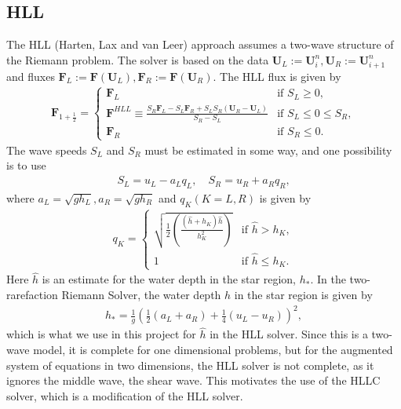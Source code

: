 \subsection*{HLL}
The HLL (Harten, Lax and van Leer) approach assumes a two-wave structure of the Riemann problem.
The solver is based on the data $\mathbf{U}_L := \mathbf{U}_i^n, \mathbf{U}_R := \mathbf{U}_{i+1}^n$ and fluxes $\mathbf{F}_L := \mathbf{F}(\mathbf{U}_L), \mathbf{F}_R := \mathbf{F}(\mathbf{U}_R)$.
The HLL flux is given by
\begin{align}\label{eq:HLL_flux}
    \mathbf{F}_{1 + \frac{1}{2}} = \begin{cases}
        \mathbf{F}_L & \text{if } S_L \geq 0, \\
        \mathbf{F}^{HLL} \equiv \frac{S_R \mathbf{F}_L - S_L \mathbf{F}_R + S_L S_R (\mathbf{U}_R - \mathbf{U}_L)}{S_R - S_L} & \text{if } S_L \leq 0 \leq S_R, \\
        \mathbf{F}_R & \text{if } S_R \leq 0.
    \end{cases}
\end{align}
The wave speeds $S_L$ and $S_R$ must be estimated in some way, and one possibility is to use 
\begin{align*}
    S_L = u_L - a_L q_L, \quad S_R = u_R + a_R q_R,
\end{align*}
where $a_L = \sqrt{g h_L}, a_R = \sqrt{g h_R}$ and  $q_K (K=L, R)$ is given by 
\begin{align*}
    q_K = 
    \begin{cases}
        \sqrt{\frac{1}{2}\left( \frac{(\hat{h} + h_K) \hat{h}}{h_K^2} \right) } & \text{if } \hat{h} > h_K, \\
        1 & \text{if } \hat{h} \leq h_K.
    \end{cases}
\end{align*}
Here $\hat{h}$ is an estimate for the water depth in the star region, $h_*$.
In the two-rarefaction Riemann Solver, the water depth $h$ in the star region is given by
\begin{align}\label{eq:two_rarefaction_hstar}
    h_* = \frac{1}{g} {\left( \frac{1}{2} (a_L + a_R) + \frac{1}{4} (u_L - u_R)  \right)}^2,
\end{align}
which is what we use in this project for $\hat{h}$ in the HLL solver.
Since this is a two-wave model, it is complete for one dimensional problems, but for the augmented system of equations in two dimensions, the HLL solver is not complete, as it ignores the middle wave, the shear wave.
This motivates the use of the HLLC solver, which is a modification of the HLL solver.

